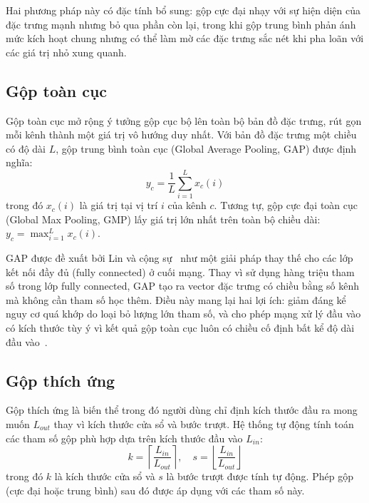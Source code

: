 Hai phương pháp này có đặc tính bổ sung: gộp cực đại nhạy với sự hiện diện của đặc trưng mạnh nhưng bỏ qua phần còn lại, trong khi gộp trung bình phản ánh mức kích hoạt chung nhưng có thể làm mờ các đặc trưng sắc nét khi pha loãn với các giá trị nhỏ xung quanh.

\subsection{Gộp toàn cục}
\label{subsec:global_pooling}

Gộp toàn cục mở rộng ý tưởng gộp cục bộ lên toàn bộ bản đồ đặc trưng, rút gọn mỗi kênh thành một giá trị vô hướng duy nhất. Với bản đồ đặc trưng một chiều có độ dài $L$, gộp trung bình toàn cục (Global Average Pooling, GAP) được định nghĩa:
\begin{equation}
y_c = \frac{1}{L} \sum_{i=1}^{L} x_c(i)
\label{eq:gap}
\end{equation}
trong đó $x_c(i)$ là giá trị tại vị trí $i$ của kênh $c$. Tương tự, gộp cực đại toàn cục (Global Max Pooling, GMP) lấy giá trị lớn nhất trên toàn bộ chiều dài: $y_c = \max_{i=1}^{L} x_c(i)$.

GAP được đề xuất bởi Lin và cộng sự~\cite{lin2014network} như một giải pháp thay thế cho các lớp kết nối đầy đủ (fully connected) ở cuối mạng. Thay vì sử dụng hàng triệu tham số trong lớp fully connected, GAP tạo ra vector đặc trưng có chiều bằng số kênh mà không cần tham số học thêm. Điều này mang lại hai lợi ích: giảm đáng kể nguy cơ quá khớp do loại bỏ lượng lớn tham số, và cho phép mạng xử lý đầu vào có kích thước tùy ý vì kết quả gộp toàn cục luôn có chiều cố định bất kể độ dài đầu vào~\cite{lin2014network}.

\subsection{Gộp thích ứng}
\label{subsec:adaptive_pooling}

Gộp thích ứng là biến thể trong đó người dùng chỉ định kích thước đầu ra mong muốn $L_{out}$ thay vì kích thước cửa sổ và bước trượt. Hệ thống tự động tính toán các tham số gộp phù hợp dựa trên kích thước đầu vào $L_{in}$:
\begin{equation}
k = \left\lceil \frac{L_{in}}{L_{out}} \right\rceil, \quad s = \left\lfloor \frac{L_{in}}{L_{out}} \right\rfloor
\label{eq:adaptive_pooling}
\end{equation}
trong đó $k$ là kích thước cửa sổ và $s$ là bước trượt được tính tự động. Phép gộp (cực đại hoặc trung bình) sau đó được áp dụng với các tham số này.

